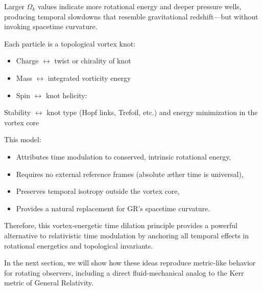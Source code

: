 Larger $\Omega_k$ values indicate more rotational energy and deeper pressure wells, producing temporal slowdowns that resemble gravitational redshift—but without invoking spacetime curvature.

Each particle is a topological vortex knot:
\begin{itemize}
    \item Charge $\leftrightarrow$ twist or chirality of knot
    \item Mass $\leftrightarrow$ integrated vorticity energy
    \item Spin $\leftrightarrow$ knot helicity:
\end{itemize}
Stability $\leftrightarrow$ knot type (Hopf links, Trefoil, etc.) and energy minimization in the vortex core

This model:

\begin{itemize}
\item Attributes time modulation to conserved, intrinsic rotational energy,
\item Requires no external reference frames (absolute æther time is universal),
\item Preserves temporal isotropy outside the vortex core,
\item Provides a natural replacement for GR's spacetime curvature.
\end{itemize}

Therefore, this vortex-energetic time dilation principle provides a powerful alternative to relativistic time modulation by anchoring all temporal effects in rotational energetics and topological invariants.

In the next section, we will show how these ideas reproduce metric-like behavior for rotating observers, including a direct fluid-mechanical analog to the Kerr metric of General Relativity.